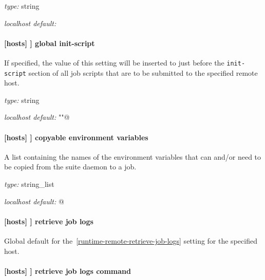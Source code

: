 \begin{myitemize}
\item {\em type:} string
\item {\em localhost default:} \lstinline@cylc@
\end{myitemize}

\paragraph[global init-script]{[hosts] \textrightarrow [[HOST]] \textrightarrow global init-script }
\label{GlobalInitScript}

If specified, the value of this setting will be inserted to just before the
\lstinline=init-script= section of all job scripts that are to be
submitted to the specified remote host.

\begin{myitemize}
\item {\em type:} string
\item {\em localhost default:} \lstinline@""@
\end{myitemize}

\paragraph[copyable environment variables]{[hosts] \textrightarrow [[HOST]] \textrightarrow copyable environment variables }

A list containing the names of the environment variables that can and/or need
to be copied from the suite daemon to a job.

\begin{myitemize}
\item {\em type:} string\_list
\item {\em localhost default:} \lstinline@[]@
\end{myitemize}

\paragraph[retrieve job logs]{[hosts] \textrightarrow [[HOST]] \textrightarrow retrieve job logs}

Global default for the~\ref{runtime-remote-retrieve-job-logs} setting for the
specified host.

\paragraph[retrieve job logs command]{[hosts] \textrightarrow [[HOST]] \textrightarrow retrieve job logs command}

